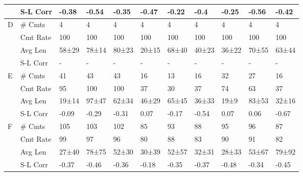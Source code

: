 \begin{table}[]
\begin{tabular}{lllllllllll}
      &  S-L Corr &         -0.38 &           -0.54 &         -0.35 &         -0.47 &           -0.22 &          -0.4 &         -0.25 &          -0.56 &         -0.42 \\ \midrule
D &    \# Cmts &             4 &               4 &             4 &             4 &               4 &             4 &             4 &              4 &             4 \\
       &  Cmt Rate &           100 &             100 &           100 &           100 &             100 &           100 &           100 &            100 &           100 \\
      &   Avg Len &  58{\tiny±29} &    78{\tiny±14} &  80{\tiny±23} &  20{\tiny±15} &    68{\tiny±40} &  40{\tiny±23} &  36{\tiny±22} &   70{\tiny±55} &  63{\tiny±44} \\
      &  S-L Corr &           - &             - &           - &           - &             - &           - &           - &            - &           - \\ \midrule
E &    \# Cmts &            41 &              43 &            43 &            16 &              13 &            16 &            32 &             27 &            16 \\
   &  Cmt Rate &            95 &             100 &           100 &            37 &              30 &            37 &            74 &             63 &            37 \\
     &   Avg Len &  19{\tiny±14} &    97{\tiny±47} &  62{\tiny±34} &  46{\tiny±29} &    65{\tiny±45} &  36{\tiny±33} &   19{\tiny±9} &   83{\tiny±53} &  32{\tiny±16} \\
       &  S-L Corr &         -0.09 &           -0.29 &         -0.31 &          0.07 &           -0.17 &         -0.54 &          0.07 &           0.06 &         -0.67 \\ \midrule
F &    \# Cmts &           105 &             103 &           102 &            85 &              93 &            88 &            95 &             96 &            87 \\
     &  Cmt Rate &            99 &              97 &            96 &            80 &              88 &            83 &            90 &             91 &            82 \\
     &   Avg Len &  27{\tiny±40} &    78{\tiny±75} &  52{\tiny±30} &  30{\tiny±39} &    52{\tiny±57} &  32{\tiny±31} &  28{\tiny±33} &   53{\tiny±67} &  79{\tiny±92} \\
      &  S-L Corr &         -0.37 &           -0.46 &         -0.36 &         -0.18 &           -0.35 &         -0.37 &         -0.48 &          -0.34 &         -0.45 \\ \midrule


\end{tabular}
\end{table}
